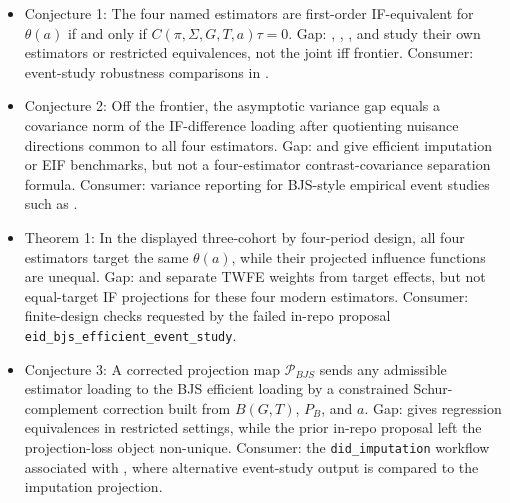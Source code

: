 \documentclass[11pt]{article}
\theoremstyle{definition}
\theoremstyle{plain}
\theoremstyle{remark}
\begin{document}
\begin{itemize}[leftmargin=*]
\item Conjecture 1: The four named estimators are first-order IF-equivalent for \(\theta(a)\) if and only if \(C(\pi,\Sigma,G,T,a)\tau=0\). Gap: \citet[Sec.~5, App.~A]{borusyak_jaravel_spiess_2024_restud}, \citet[Sec.~3.1--3.2]{sun_abraham_2021_joe}, \citet[Sec.~3--4]{callaway_santanna_2021_joe}, and \citet[Sec.~3]{wooldridge_2023_ectj} study their own estimators or restricted equivalences, not the joint iff frontier. Consumer: event-study robustness comparisons in \citet{roth_2026_eventstudy_note}.
\item Conjecture 2: Off the frontier, the asymptotic variance gap equals a covariance norm of the IF-difference loading after quotienting nuisance directions common to all four estimators. Gap: \citet[Sec.~4 and App.~A]{borusyak_jaravel_spiess_2024_restud} and \citet[Thm.~1, Sec.~3]{chen_santanna_xie_2025} give efficient imputation or EIF benchmarks, but not a four-estimator contrast-covariance separation formula. Consumer: variance reporting for BJS-style empirical event studies such as \citet[Sec.~5]{borusyak_jaravel_spiess_2024_restud}.
\item Theorem 1: In the displayed three-cohort by four-period design, all four estimators target the same \(\theta(a)\), while their projected influence functions are unequal. Gap: \citet[Sec.~3]{goodman_bacon_2021_joe} and \citet[Thm.~1, Sec.~3]{dechaisemartin_dhaultfoeuille_2020_aer} separate TWFE weights from target effects, but not equal-target IF projections for these four modern estimators. Consumer: finite-design checks requested by the failed in-repo proposal \texttt{eid\_bjs\_efficient\_event\_study}.
\item Conjecture 3: A corrected projection map \(\mathcal P_{BJS}\) sends any admissible estimator loading to the BJS efficient loading by a constrained Schur-complement correction built from \(B(G,T)\), \(P_B\), and \(a\). Gap: \citet[Sec.~3]{wooldridge_2023_ectj} gives regression equivalences in restricted settings, while the prior in-repo proposal left the projection-loss object non-unique. Consumer: the \texttt{did\_imputation} workflow associated with \citet{borusyak_jaravel_spiess_2024_restud}, where alternative event-study output is compared to the imputation projection.
\end{itemize}
\end{document}
